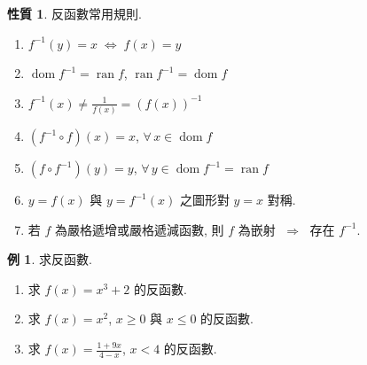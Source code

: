 \documentclass[12pt,a4paper]{extarticle}
\newcommand{\ds}{\displaystyle}
\newcommand{\ie}{\;\Longrightarrow\;}
\newcommand{\ifff}{\;\Longleftrightarrow\;}
\DeclareMathOperator*{\dom}{dom}
\DeclareMathOperator*{\ran}{ran}
\theoremstyle{definition}
\newtheorem*{prp}{性質}
\newtheorem*{ex}{例}
\begin{document}
\begin{prp} 反函數常用規則. 
  \setlength{\columnsep}{-0mm}
  \begin{multicols}{2}
    \begin{enumerate}\setlength\itemsep{0em}
      \item $f^{-1}(y) = x \ifff f(x) = y$
      \item $\dom f^{-1} = \ran f$, $\ran f^{-1} = \dom f$
      \item $\ds f^{-1}(x) \not= \frac{1}{f(x)} = (f(x))^{-1}$
      \item $(f^{-1}\circ f)(x) = x$, $\forall\,x\in\dom f$
      \item $(f\circ f^{-1})(y) = y$, $\forall\,y\in\dom f^{-1} = \ran f$
      \item $y = f(x)$ 與 $y = f^{-1}(x)$ 之圖形對 $y = x$ 對稱. 
      \item 若 $f$ 為嚴格遞增或嚴格遞減函數, 則 $f$ 為嵌射 $\ie$ 存在 $f^{-1}$. 
    \end{enumerate}
  \end{multicols}
\end{prp}

\begin{ex} 求反函數. 
    \begin{enumerate}\setlength\itemsep{0em}
      \item 求 $f(x) = x^3 + 2$ 的反函數. 
      \item 求 $f(x) = x^2$, $x\geqslant 0$ 與 $x\leqslant 0$ 的反函數.
      \item 求 $\ds f(x) = \frac{1 + 9 x}{4 - x}$, $x < 4$ 的反函數. 
    \end{enumerate}
\end{ex}
\end{document}
